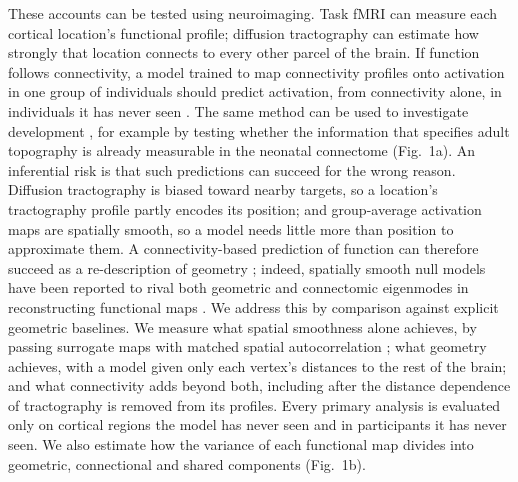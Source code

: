 \documentclass[11pt]{article}
\begin{document}
These accounts can be tested using neuroimaging. Task fMRI can measure each cortical
location's functional profile; diffusion tractography can estimate how strongly that location connects to every other parcel of
the brain. If
function follows connectivity, a model trained to map connectivity profiles
onto activation in one group of individuals should predict activation, from
connectivity alone, in individuals it has never seen
\citep{saygin2011,osher2016}. The same method can be used to investigate development \citep{saygin2016}, for example by testing
whether the information that specifies adult topography is already
measurable in the neonatal connectome \citep{cabral2022} (Fig.~1a). An inferential risk is that such
predictions can succeed for the wrong reason. Diffusion tractography is
biased toward nearby targets, so a location's tractography profile partly
encodes its position; and group-average activation maps are spatially
smooth, so a model needs little more than position to approximate them. A
connectivity-based prediction of function can therefore succeed as a
re-description of geometry \citep{donahue2016,pang2023}; indeed, spatially
smooth null models have been reported to rival both geometric and
connectomic eigenmodes in reconstructing functional maps \citep{olsen2025}.
We address this by comparison against explicit
geometric baselines. We measure what spatial smoothness alone achieves, by
passing surrogate maps with matched spatial autocorrelation
\citep{burt2020}; what geometry achieves,
with a model given only each vertex's distances to the rest of the brain; and
what connectivity adds beyond both, including after the distance dependence
of tractography is removed from its profiles. Every
primary analysis is evaluated only on cortical regions the model has never
seen and in participants it has never seen. We also
estimate how the variance of each functional map divides into geometric,
connectional and shared components (Fig.~1b).
\end{document}
